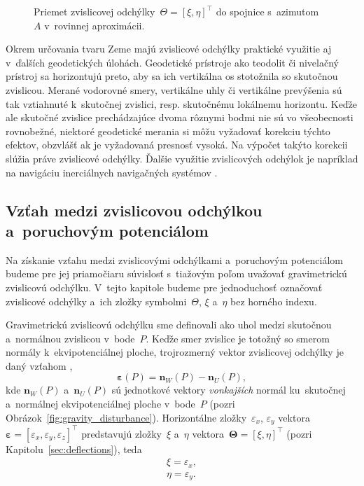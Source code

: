 \documentclass[a4paper, 12pt]{book}
\let\vec\mathbf
\begin{document}
\begin{figure}[bt]
\centering

\caption{Priemet zvislicovej odchýlky~$\Theta = [\xi, \eta]^\top$ do spojnice 
s~azimutom~$A$ v~rovinnej aproximácii.}
\label{fig:deflections_projection}
\end{figure}

Okrem určovania tvaru Zeme majú zvislicové odchýlky praktické využitie aj 
v~ďalších geodetických úlohách.  Geodetické prístroje ako teodolit či nivelačný 
prístroj sa horizontujú preto, aby sa ich vertikálna os stotožnila so skutočnou 
zvislicou.  Merané vodorovné smery, vertikálne uhly či vertikálne prevýšenia sú 
tak vztiahnuté k~skutočnej zvislici, resp. skutočnému lokálnemu horizontu.  
Keďže ale skutočné zvislice prechádzajúce dvoma rôznymi bodmi nie sú vo 
všeobecnosti rovnobežné, niektoré geodetické merania si môžu vyžadovať korekciu 
týchto efektov, obzvlášť ak je vyžadovaná presnosť vysoká.  Na výpočet takýto 
korekcii slúžia práve zvislicové odchýlky.  Ďalšie využitie zvislicových 
odchýlok je napríklad na navigáciu inerciálnych navigačných systémov 
\parencite[pozri napríklad][]{Jekeli2000}.


\subsection{Vzťah medzi zvislicovou odchýlkou a~poruchovým potenciálom}
\label{sec:deflections_disturbing_potential}

Na získanie vzťahu medzi zvislicovými odchýlkami a~poruchovým potenciálom 
budeme pre jej priamočiaru súvislosť s~tiažovým poľom uvažovať gravimetrickú 
zvislicovú odchýlku.  V~tejto kapitole budeme pre jednoduchosť označovať 
zvislicové odchýlky a~ich zložky symbolmi~$\Theta$, $\xi$ a~$\eta$ bez horného 
indexu.

Gravimetrickú zvislicovú odchýlku sme definovali ako uhol medzi skutočnou 
a~normálnou zvislicou v~bode~$P$.  Keďže smer zvislice je totožný so smerom 
normály k~ekvipotenciálnej ploche, trojrozmerný vektor zvislicovej odchýlky je 
daný vzťahom \parencite{SansoGeoidDetermination},
%
\begin{equation}
\label{eq:deflection_eps}
\boldsymbol\varepsilon(P) = \vec n_W(P) - \vec n_U(P){,}
\end{equation}
%
kde $\vec n_W(P)$ a~$\vec n_U(P)$ sú jednotkové vektory \emph{vonkajších} 
normál ku~skutočnej a~normálnej ekvipotenciálnej ploche v~bode~$P$ (pozri 
Obrázok~\ref{fig:gravity_disturbance}).  Horizontálne zložky~$\varepsilon_x$, 
$\varepsilon_y$ vektora~$\boldsymbol\varepsilon = [\varepsilon_x, 
\varepsilon_y, \varepsilon_z]^\top$ predstavujú zložky~$\xi$ a~$\eta$ 
vektora~$\boldsymbol\Theta = [\xi, \eta]^\top$ (pozri 
Kapitolu~\ref{sec:deflections}), teda
%
\begin{equation}
\label{eq:xi_eta_eps}
\begin{split}
\xi = \varepsilon_x{,}\\
\eta = \varepsilon_y{.}
\end{split}
\end{equation}
\end{document}
